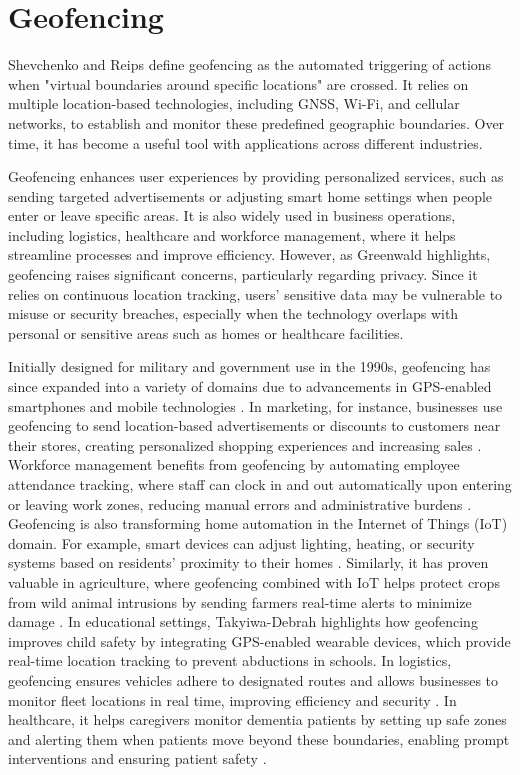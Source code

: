 \section{Geofencing}
Shevchenko and Reips \cite{shevchenko2024geofencing} define geofencing as the automated triggering of actions when "virtual boundaries around specific locations" are crossed. It relies on multiple location-based technologies, including GNSS, Wi-Fi, and cellular networks, to establish and monitor these predefined geographic boundaries. Over time, it has become a useful tool with applications across different industries.

Geofencing enhances user experiences by providing personalized services, such as sending targeted advertisements or adjusting smart home settings when people enter or leave specific areas. It is also widely used in business operations, including logistics, healthcare and workforce management, where it helps streamline processes and improve efficiency. However, as Greenwald \cite{greenwald2011geofencing} highlights, geofencing raises significant concerns, particularly regarding privacy. Since it relies on continuous location tracking, users' sensitive data may be vulnerable to misuse or security breaches, especially when the technology overlaps with personal or sensitive areas such as homes or healthcare facilities.

Initially designed for military and government use in the 1990s, geofencing has since expanded into a variety of domains due to advancements in GPS-enabled smartphones and mobile technologies \cite{westbrook2019gps}. In marketing, for instance, businesses use geofencing to send location-based advertisements or discounts to customers near their stores, creating personalized shopping experiences and increasing sales \cite{greenwald2011geofencing}. Workforce management benefits from geofencing by automating employee attendance tracking, where staff can clock in and out automatically upon entering or leaving work zones, reducing manual errors and administrative burdens \cite{amudha2019smarthome}.
Geofencing is also transforming home automation in the Internet of Things (IoT) domain. For example, smart devices can adjust lighting, heating, or security systems based on residents' proximity to their homes \cite{amudha2019smarthome}. Similarly, it has proven valuable in agriculture, where geofencing combined with IoT helps protect crops from wild animal intrusions by sending farmers real-time alerts to minimize damage \cite{kadam2020crops}. In educational settings, Takyiwa-Debrah \cite{takyiwa2023geofence} highlights how geofencing improves child safety by integrating GPS-enabled wearable devices, which provide real-time location tracking to prevent abductions in schools.
In logistics, geofencing ensures vehicles adhere to designated routes and allows businesses to monitor fleet locations in real time, improving efficiency and security \cite{reclus2009fleet}. In healthcare, it helps caregivers monitor dementia patients by setting up safe zones and alerting them when patients move beyond these boundaries, enabling prompt interventions and ensuring patient safety \cite{arora2023location}.

